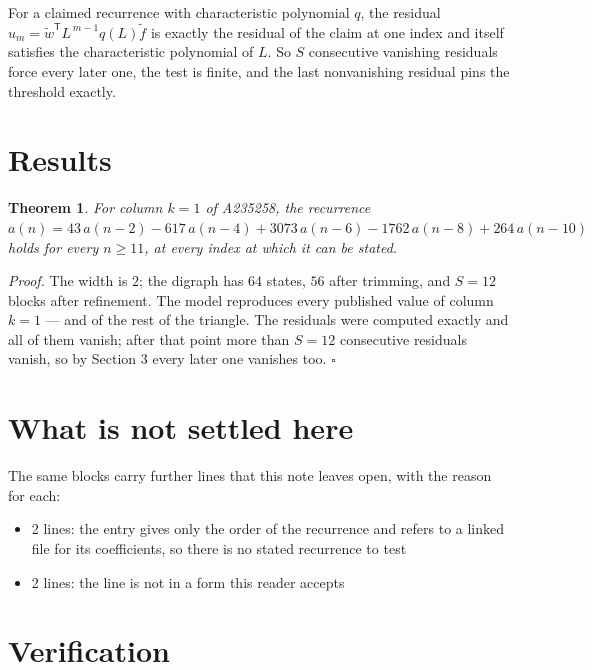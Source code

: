 \documentclass[11pt]{article}
\newtheorem{theorem}{Theorem}
\theoremstyle{definition}
\begin{document}
For a claimed recurrence with characteristic polynomial $q$, the residual $u_m = \tilde w^{\mathsf T}L^{\,m-1}q(L)\tilde f$ is exactly the residual of the claim at one index and itself satisfies the characteristic polynomial of $L$. So $S$ consecutive vanishing residuals force every later one, the test is finite, and the last nonvanishing residual pins the threshold exactly.

\section{Results}

\begin{theorem} For column $k = 1$ of A235258, the recurrence $a(n) = 43\,a(n-2) - 617\,a(n-4) + 3073\,a(n-6) - 1762\,a(n-8) + 264\,a(n-10)$ holds for every $n \ge 11$, at every index at which it can be stated.\end{theorem}

{\itshape Proof.} The width is $2$; the digraph has $64$ states, $56$ after trimming, and $S = 12$ blocks after refinement. The model reproduces every published value of column $k = 1$ --- and of the rest of the triangle. The residuals were computed exactly and all of them vanish; after that point more than $S = 12$ consecutive residuals vanish, so by Section 3 every later one vanishes too. $\square$

\section{What is not settled here}

The same blocks carry further lines that this note leaves open, with the reason for each:

\begin{itemize}

\item 2 lines: the entry gives only the order of the recurrence and refers to a linked file for its coefficients, so there is no stated recurrence to test

\item 2 lines: the line is not in a form this reader accepts

\end{itemize}

\section{Verification}
\end{document}
